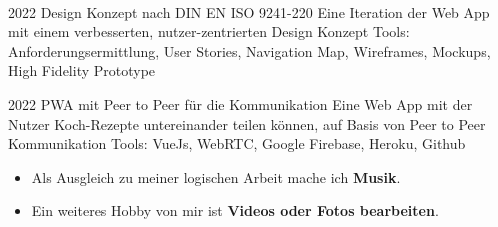 \begin{paracol}{2}
    \begin{leftcolumn}
    

    
    
    \end{leftcolumn}
    
    \begin{rightcolumn}
    
     \\[14pt]
    \vspace{-12pt}
    
    \vfill\null
    \cvevent
        {2022}
        {Design Konzept nach DIN EN ISO 9241-220}
        {}
        {Eine Iteration der Web App mit einem verbesserten, nutzer-zentrierten Design Konzept}
        {Tools: Anforderungsermittlung, User Stories, Navigation Map, Wireframes, Mockups, High Fidelity Prototype}
    \vfill\null
    
    \cvevent
        {2022}
        {PWA mit Peer to Peer für die Kommunikation}
        {}
        {Eine Web App mit der Nutzer Koch-Rezepte untereinander teilen können, auf Basis von Peer to Peer Kommunikation}
        {Tools: VueJs, WebRTC, Google Firebase, Heroku, Github}
    \vfill\null
    
    \vfill\null
    \vspace{-0.3cm}
    \begin{itemize}
      \item Als Ausgleich zu meiner logischen Arbeit mache ich \textbf{Musik}.
      \item Ein weiteres Hobby von mir ist \textbf{Videos oder Fotos bearbeiten}.
    \end{itemize}
    \vfill\null
    
    \vfill
    \vfill
    \vfill
    \end{rightcolumn}
    \end{paracol}